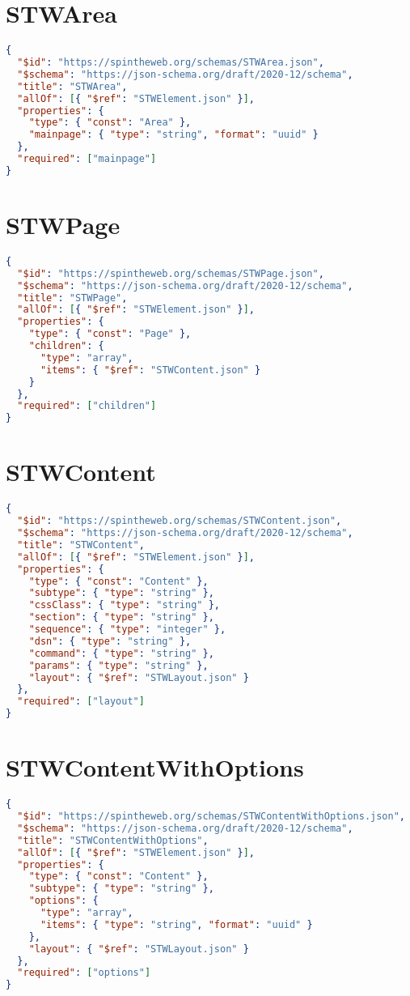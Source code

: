 \section{STWArea}
\begin{lstlisting}[language=JSON,caption={STWArea Schema Definition}]
{
  "$id": "https://spintheweb.org/schemas/STWArea.json",
  "$schema": "https://json-schema.org/draft/2020-12/schema",
  "title": "STWArea",
  "allOf": [{ "$ref": "STWElement.json" }],
  "properties": {
    "type": { "const": "Area" },
    "mainpage": { "type": "string", "format": "uuid" }
  },
  "required": ["mainpage"]
}
\end{lstlisting}

\section{STWPage}
\begin{lstlisting}[language=JSON,caption={STWPage Schema Definition}]
{
  "$id": "https://spintheweb.org/schemas/STWPage.json",
  "$schema": "https://json-schema.org/draft/2020-12/schema",
  "title": "STWPage",
  "allOf": [{ "$ref": "STWElement.json" }],
  "properties": {
    "type": { "const": "Page" },
    "children": {
      "type": "array",
      "items": { "$ref": "STWContent.json" }
    }
  },
  "required": ["children"]
}
\end{lstlisting}

\section{STWContent}
\begin{lstlisting}[language=JSON,caption={STWContent Schema Definition}]
{
  "$id": "https://spintheweb.org/schemas/STWContent.json",
  "$schema": "https://json-schema.org/draft/2020-12/schema",
  "title": "STWContent",
  "allOf": [{ "$ref": "STWElement.json" }],
  "properties": {
    "type": { "const": "Content" },
    "subtype": { "type": "string" },
    "cssClass": { "type": "string" },
    "section": { "type": "string" },
    "sequence": { "type": "integer" },
    "dsn": { "type": "string" },
    "command": { "type": "string" },
    "params": { "type": "string" },
    "layout": { "$ref": "STWLayout.json" }
  },
  "required": ["layout"]
}
\end{lstlisting}

\section{STWContentWithOptions}
\begin{lstlisting}[language=JSON,caption={STWContentWithOptions Schema Definition}]
{
  "$id": "https://spintheweb.org/schemas/STWContentWithOptions.json",
  "$schema": "https://json-schema.org/draft/2020-12/schema",
  "title": "STWContentWithOptions",
  "allOf": [{ "$ref": "STWElement.json" }],
  "properties": {
    "type": { "const": "Content" },
    "subtype": { "type": "string" },
    "options": {
      "type": "array",
      "items": { "type": "string", "format": "uuid" }
    },
    "layout": { "$ref": "STWLayout.json" }
  },
  "required": ["options"]
}
\end{lstlisting}

